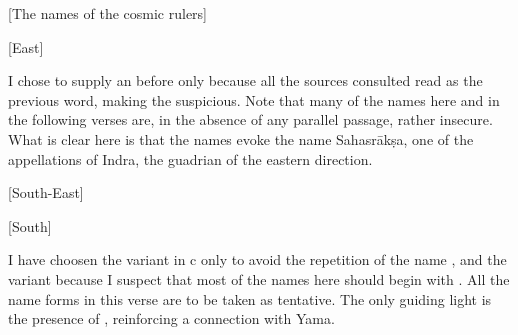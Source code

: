 \begin{center}
{{[The names of the cosmic rulers]}}
\end{center}



\begin{center}{{[East]}}\end{center}




{ I chose to supply an  before  only because all the sources                  consulted read  as the previous word, making the                   suspicious.                  Note that many of the names here and in the following verses are,                 in the absence of any parallel passage, rather insecure.                 What is clear here is that the names evoke the name Sahasrākṣa,                 one of the appellations of                 Indra, the guadrian of the eastern direction. }




\begin{center}{{[South-East]}}\end{center}













\begin{center}{{[South]}}\end{center}




{ I have choosen the variant  in  c only to avoid the repetition of                         the name , and the variant  because I suspect that                         most of the names here should begin with . All the name forms                         in this verse are to be taken as tentative. The only                          guiding light is the presence of , reinforcing a connection with Yama. }




